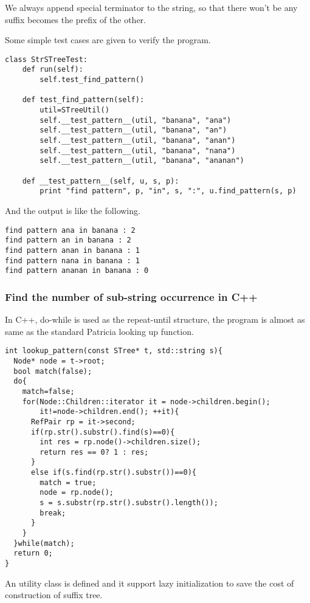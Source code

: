 \documentclass{article}
\begin{document}
We always append special terminator to the string, so that there won't
be any suffix becomes the prefix of the other\cite{wiki-suffix-tree}.

Some simple test cases are given to verify the program.

\begin{lstlisting}
class StrSTreeTest:
    def run(self):
        self.test_find_pattern()

    def test_find_pattern(self):
        util=STreeUtil()
        self.__test_pattern__(util, "banana", "ana")
        self.__test_pattern__(util, "banana", "an")
        self.__test_pattern__(util, "banana", "anan")
        self.__test_pattern__(util, "banana", "nana")
        self.__test_pattern__(util, "banana", "ananan")

    def __test_pattern__(self, u, s, p):
        print "find pattern", p, "in", s, ":", u.find_pattern(s, p)
\end{lstlisting}

And the output is like the following.

\begin{verbatim}
find pattern ana in banana : 2
find pattern an in banana : 2
find pattern anan in banana : 1
find pattern nana in banana : 1
find pattern ananan in banana : 0
\end{verbatim}

\subsubsection*{Find the number of sub-string occurrence in C++}
In C++, do-while is used as the repeat-until structure, the program
is almost as same as the standard Patricia looking up function.

\lstset{language=C++}
\begin{lstlisting}
int lookup_pattern(const STree* t, std::string s){
  Node* node = t->root;
  bool match(false);
  do{
    match=false;
    for(Node::Children::iterator it = node->children.begin();
        it!=node->children.end(); ++it){
      RefPair rp = it->second;
      if(rp.str().substr().find(s)==0){
        int res = rp.node()->children.size();
        return res == 0? 1 : res;
      }
      else if(s.find(rp.str().substr())==0){
        match = true;
        node = rp.node();
        s = s.substr(rp.str().substr().length());
        break;
      }
    }
  }while(match);
  return 0;
}
\end{lstlisting}

An utility class is defined and it support lazy initialization to save
the cost of construction of suffix tree.
\end{document}
